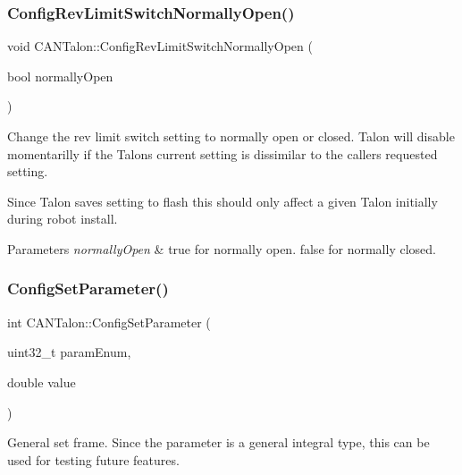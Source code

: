 \subsubsection{\texorpdfstring{Config\+Rev\+Limit\+Switch\+Normally\+Open()}{ConfigRevLimitSwitchNormallyOpen()}}
{\footnotesize\ttfamily void C\+A\+N\+Talon\+::\+Config\+Rev\+Limit\+Switch\+Normally\+Open (\begin{DoxyParamCaption}\item[{bool}]{normally\+Open }\end{DoxyParamCaption})}

Change the rev limit switch setting to normally open or closed. Talon will disable momentarilly if the Talon\textquotesingle{}s current setting is dissimilar to the caller\textquotesingle{}s requested setting.

Since Talon saves setting to flash this should only affect a given Talon initially during robot install.


\begin{DoxyParams}{Parameters}
{\em normally\+Open} & true for normally open. false for normally closed. \\
\hline
\end{DoxyParams}
\mbox{\label{class_c_a_n_talon_a3b5993220e40d12ebf6d755434783496}} 
\subsubsection{\texorpdfstring{Config\+Set\+Parameter()}{ConfigSetParameter()}}
{\footnotesize\ttfamily int C\+A\+N\+Talon\+::\+Config\+Set\+Parameter (\begin{DoxyParamCaption}\item[{uint32\+\_\+t}]{param\+Enum,  }\item[{double}]{value }\end{DoxyParamCaption})}

General set frame. Since the parameter is a general integral type, this can be used for testing future features. \mbox{\label{class_c_a_n_talon_a3e5d464de61b9005f33edd0b9db714ec}} 
